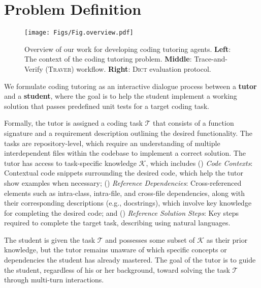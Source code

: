 \section{Problem Definition}

\begin{figure*}[th!]
\centering
\texttt{[image: Figs/Fig.overview.pdf]}
\caption{Overview of our work for developing coding tutoring agents. \textbf{Left}: The context of the coding tutoring problem. \textbf{Middle}: Trace-and-Verify (\textsc{Traver}) workflow. \textbf{Right}: \textsc{Dict} evaluation protocol.
}
\label{fig:overview}
\end{figure*}



We formulate coding tutoring as an interactive dialogue process between a \textbf{tutor} and a \textbf{student}, where the goal is to help the student implement a working solution that passes predefined unit tests for a target coding task.

Formally, the tutor is assigned a coding task $\mathcal{T}$ that consists of a function signature and a requirement description outlining the desired functionality. 
The tasks are repository-level, which require an understanding of multiple interdependent files within the codebase to implement a correct solution.
The tutor has access to task-specific knowledge $\mathcal{K}$, which includes () \textit{Code Contexts}: Contextual code snippets surrounding the desired code, which help the tutor show examples when necessary; () \textit{Reference Dependencies}: Cross-referenced elements such as intra-class, intra-file, and cross-file dependencies, along with their corresponding descriptions (e.g., docstrings), which involve key knowledge for completing the desired code; and () \textit{Reference Solution Steps}: Key steps required to complete the target task, describing using natural languages. 

The student is given the task $\mathcal{T}$ and possesses some subset of $\mathcal{K}$ as their prior knowledge, but the tutor remains unaware of which specific concepts or dependencies the student has already mastered.
The goal of the tutor is to guide the student, regardless of his or her background, toward solving the task $\mathcal{T}$ through multi-turn interactions.
